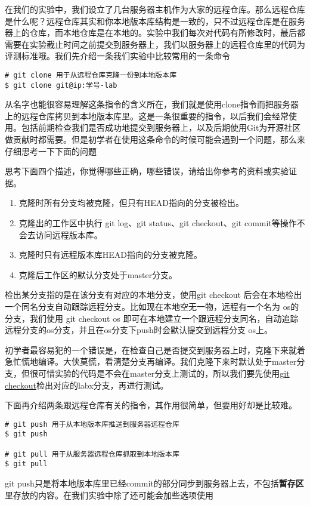 在我们的实验中，我们设立了几台服务器主机作为大家的远程仓库。那么远程仓库是什么呢？远程仓库其实和你本地版本库结构是一致的，只不过远程仓库是在服务器上的仓库，而本地仓库是在本地的。实验中我们每次对代码有所修改时，最后都需要在实验截止时间之前提交到服务器上，我们以服务器上的远程仓库里的代码为评测标准哦。我们先介绍一条我们实验中比较常用的一条命令

\begin{verbatim}
# git clone 用于从远程仓库克隆一份到本地版本库
$ git clone git@ip:学号-lab
\end{verbatim}

从名字也能很容易理解这条指令的含义所在，我们就是使用clone指令而把服务器上的远程仓库拷贝到本地版本库里。这是一条很重要的指令，以后我们会经常使用。包括前期检查我们是否成功地提交到服务器上，以及后期使用Git为开源社区做贡献时都需要。但是初学者在使用这条命令的时候可能会遇到一个问题，那么来仔细思考一下下面的问题\par

\begin{thinking}\label{think-克隆}
思考下面四个描述，你觉得哪些正确，哪些错误，请给出你参考的资料或实验证据。
\begin{enumerate}
  \item 克隆时所有分支均被克隆，但只有HEAD指向的分支被检出。
  \item 克隆出的工作区中执行 git log、git status、git checkout、git commit等操作不会去访问远程版本库。
  \item 克隆时只有远程版本库HEAD指向的分支被克隆。
  \item 克隆后工作区的默认分支处于master分支。
\end{enumerate}
\end{thinking}

\begin{note}
检出某分支指的是在该分支有对应的本地分支，使用git checkout 后会在本地检出一个同名分支自动跟踪远程分支。比如现在本地空无一物，远程有一个名为 os的分支，我们使用 git checkout os 即可在本地建立一个跟远程分支同名，自动追踪远程分支的os分支，并且在os分支下push时会默认提交到远程分支 os上。
\end{note}

初学者最容易犯的一个错误是，在检查自己是否提交到服务器上时，克隆下来就着急忙慌地编译。大侠莫慌，看清楚分支再编译。我们克隆下来时默认处于master分支，但很可惜实验的代码是不会在master分支上测试的，所以我们要先使用\hyperref[git checkout]{git checkout}检出对应的labx分支，再进行测试。

下面再介绍两条跟远程仓库有关的指令，其作用很简单，但要用好却是比较难。
\begin{verbatim}
# git push 用于从本地版本库推送到服务器远程仓库
$ git push

# git pull 用于从服务器远程仓库抓取到本地版本库
$ git pull
\end{verbatim}
git push只是将本地版本库里已经commit的部分同步到服务器上去，不包括\textbf{暂存区}里存放的内容。在我们实验中除了还可能会加些选项使用

